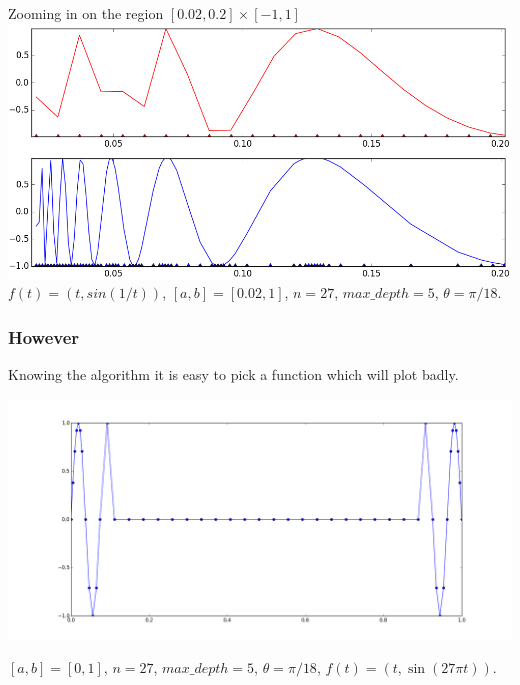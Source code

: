 \documentclass{beamer}
\begin{document}
\begin{frame}
Zooming in on the region $[0.02, 0.2] \times [-1,1]$
\includegraphics[width=\textwidth]{comparison_zoom.png} \\
\footnotesize
$f(t) = (t, sin(1/t))$, $[a,b] = [0.02, 1]$, $n = 27$, $max\_depth = 5$, $\theta = \pi / 18$.
\normalsize
\end{frame}

\begin{frame}
\frametitle{However}
\footnotesize
Knowing the algorithm it is easy to pick a function which will plot badly. \\
\begin{center}
\includegraphics[width=\textwidth]{evil.png}
\end{center}
$[a,b] = [0, 1]$, $n = 27$, $max\_depth = 5$, $\theta = \pi / 18$,
\pause
$f(t) = (t, \sin(27 \pi t))$.
\normalsize
\end{frame}
\end{document}
